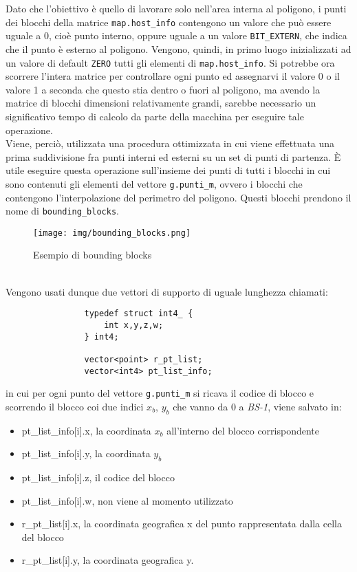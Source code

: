 			Dato che l'obiettivo \`{e} quello di lavorare solo nell'area interna al poligono, i punti dei blocchi della matrice \texttt{map.host\_info} contengono un valore che pu\`{o} essere uguale a 0, cio\`{e} punto interno, oppure uguale a un valore \texttt{BIT\_EXTERN}, che indica che il punto \`{e} esterno al poligono. Vengono, quindi, in primo luogo inizializzati ad un valore di default \texttt{ZERO} tutti gli elementi di \texttt{map.host\_info}. Si potrebbe ora scorrere l'intera matrice per controllare ogni punto ed assegnarvi il valore 0 o il valore 1 a seconda che questo stia dentro o fuori al poligono, ma avendo la matrice di blocchi dimensioni relativamente grandi, sarebbe necessario un significativo tempo di calcolo da parte della macchina per eseguire tale operazione.\\
			Viene, perci\`{o}, utilizzata una procedura ottimizzata in cui viene effettuata una prima suddivisione fra punti interni ed esterni su un set di punti di partenza. \`{E} utile eseguire questa operazione sull'insieme dei punti di tutti i blocchi in cui sono contenuti gli elementi del vettore \texttt{g.punti\_m}, ovvero i blocchi che contengono l'interpolazione del perimetro del poligono. Questi blocchi prendono il nome di \texttt{bounding\_blocks}.		
			\begin{figure}[!htbp]
				\centering
				\texttt{[image: img/bounding\_blocks.png]}
				\caption{Esempio di bounding blocks}
			\end{figure}\\
			Vengono usati dunque due vettori di supporto di uguale lunghezza chiamati: 
			\begin{verbatim}
				typedef struct int4_ {
				    int x,y,z,w;
				} int4;

				vector<point> r_pt_list;
				vector<int4> pt_list_info;
			\end{verbatim}  
			in cui per ogni punto del vettore \texttt{g.punti\_m} si ricava il codice di blocco e scorrendo il blocco coi due indici $x_b$, $y_b$ che vanno da 0 a \textit{BS-1}, viene salvato in:
			\begin{itemize}
				\item pt\_list\_info[i].x, la coordinata $x_b$ all'interno del blocco corrispondente
				\item pt\_list\_info[i].y, la coordinata $y_b$
				\item pt\_list\_info[i].z, il codice del blocco
				\item pt\_list\_info[i].w, non viene al momento utilizzato
				\item r\_pt\_list[i].x, la coordinata geografica x del punto rappresentata dalla cella del blocco
				\item r\_pt\_list[i].y, la coordinata geografica y. 
			\end{itemize}
